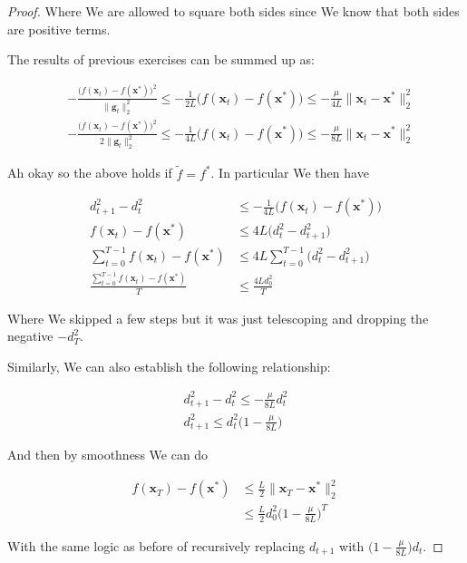 \documentclass{article}
\begin{document}
\begin{proof}
	Where We are allowed to square both sides since We know that both sides are positive terms. 
	
	The results of previous exercises can be summed up as:
	
	\begin{align}
		&-\frac{\big( f(\mathbf{x}_t) - f(\mathbf{x}^*) \big)^2}{\|\mathbf{g}_t\|^2_2} \le -\frac{1}{2L}  \big(f(\mathbf{x}_t) -  f(\mathbf{x}^*)\big)  \le  - \frac{\mu}{4L}\|\mathbf{x}_t - \mathbf{x}^*\|^2_2\\
		&-\frac{\big( f(\mathbf{x}_t) - f(\mathbf{x}^*) \big)^2}{2\|\mathbf{g}_t\|^2_2} \le -\frac{1}{4L}  \big(f(\mathbf{x}_t) -  f(\mathbf{x}^*)\big)  \le  - \frac{\mu}{8L}\|\mathbf{x}_t - \mathbf{x}^*\|^2_2
	\end{align}
	
	Ah okay so the above holds if $\tilde{f} = f^*$. In particular We then have
	
	\begin{align}
		d_{t+1}^2 - d_t^2 &\le -\frac{1}{4L}  \big(f(\mathbf{x}_t) -  f(\mathbf{x}^*)\big)\\
		f(\mathbf{x}_t) -  f(\mathbf{x}^*)  &\le  4L\big(d_t^2 - d_{t+1}^2 \big)\\
		\sum^{T-1}_{t=0} f(\mathbf{x}_t) -  f(\mathbf{x}^*)  &\le  4L \sum^{T-1}_{t=0}  \big(d_t^2 - d_{t+1}^2 \big)\\
		\frac{\sum^{T-1}_{t=0} f(\mathbf{x}_t) -  f(\mathbf{x}^*)}{T}  &\le  \frac{4Ld_0^2}{T}
	\end{align}
	
	Where We skipped a few steps but it was just telescoping and dropping the negative $-d_T^2$. 
	
	Similarly, We can also establish the following relationship:
	
	\begin{align}
		d_{t+1}^2 - d_t^2 \le - \frac{\mu}{8L}d_t^2\\
		d_{t+1}^2  \le d_t^2\bigg( 1-\frac{\mu}{8L}\bigg)
	\end{align}
	
	And then by smoothness We can do
	
	\begin{align}
		f(\mathbf{x}_T) - f(\mathbf{x}^*) &\le \frac{L}{2}\|\mathbf{x}_T - \mathbf{x}^* \|^2_2\\
		&\le \frac{L}{2}d_0^2\bigg( 1-\frac{\mu}{8L}\bigg)^T
	\end{align}
	
	With the same logic as before of recursively replacing $d_{t+1}$ with $\big(1 - \frac{\mu}{8L}\big)d_t$.
	

\end{proof}
\end{document}
